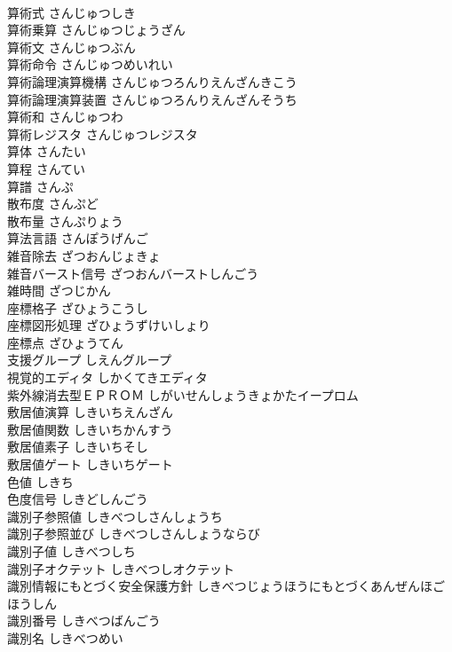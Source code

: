 \documentclass[8pt]{extreport}
\begin{document}
\begin{CJK}{UTF8}{min}
\\	算術式	さんじゅつしき	
\\	算術乗算	さんじゅつじょうざん	
\\	算術文	さんじゅつぶん	
\\	算術命令	さんじゅつめいれい	
\\	算術論理演算機構	さんじゅつろんりえんざんきこう	
\\	算術論理演算装置	さんじゅつろんりえんざんそうち	
\\	算術和	さんじゅつわ	
\\	算術レジスタ	さんじゅつレジスタ	
\\	算体	さんたい	
\\	算程	さんてい	
\\	算譜	さんぷ	
\\	散布度	さんぷど	
\\	散布量	さんぷりょう	
\\	算法言語	さんぽうげんご	
\\	雑音除去	ざつおんじょきょ	
\\	雑音バースト信号	ざつおんバーストしんごう	
\\	雑時間	ざつじかん	
\\	座標格子	ざひょうこうし	
\\	座標図形処理	ざひょうずけいしょり	
\\	座標点	ざひょうてん	
\\	支援グループ	しえんグループ	
\\	視覚的エディタ	しかくてきエディタ	
\\	紫外線消去型ＥＰＲＯＭ	しがいせんしょうきょかたイープロム	
\\	敷居値演算	しきいちえんざん	
\\	敷居値関数	しきいちかんすう	
\\	敷居値素子	しきいちそし	
\\	敷居値ゲート	しきいちゲート	
\\	色値	しきち	
\\	色度信号	しきどしんごう	
\\	識別子参照値	しきべつしさんしょうち	
\\	識別子参照並び	しきべつしさんしょうならび	
\\	識別子値	しきべつしち	
\\	識別子オクテット	しきべつしオクテット	
\\	識別情報にもとづく安全保護方針	しきべつじょうほうにもとづくあんぜんほごほうしん	
\\	識別番号	しきべつばんごう	
\\	識別名	しきべつめい	

\end{CJK}
\end{document}
